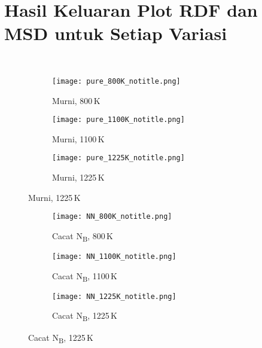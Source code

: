 \section{Hasil Keluaran Plot RDF dan MSD untuk Setiap Variasi}\
\begin{figure}[H]
  \centering
  \begin{subfigure}{0.9\textwidth}
    \centering
    \texttt{[image: pure\_800K\_notitle.png]}
    \caption{Murni, 800 K}
    \label{subfig:rdf_msd_pure_800k}
  \end{subfigure}
  \vspace{1em}
  \begin{subfigure}{0.9\textwidth}
    \centering
    \texttt{[image: pure\_1100K\_notitle.png]}
    \caption{Murni, 1100 K}
    \label{subfig:rdf_msd_pure_1100k}
  \end{subfigure}
  \vspace{1em}
  \begin{subfigure}{0.9\textwidth}
    \centering
    \texttt{[image: pure\_1225K\_notitle.png]}
    \caption{Murni, 1225 K}
    \label{subfig:rdf_msd_pure_1225k}
  \end{subfigure}
  \label{fig:rdf_msd_grid}
\end{figure}

\begin{figure}[H]\ContinuedFloat
  \centering
  \begin{subfigure}{0.9\textwidth}
    \centering
    \texttt{[image: NN\_800K\_notitle.png]}
    \caption{Cacat N\textsubscript{B}, 800 K}
    \label{subfig:rdf_msd_nn_800k}
  \end{subfigure}
  \vspace{1em}
  \begin{subfigure}{0.9\textwidth}
    \centering
    \texttt{[image: NN\_1100K\_notitle.png]}
    \caption{Cacat N\textsubscript{B}, 1100 K}
    \label{subfig:rdf_msd_nn_1100k}
  \end{subfigure}
  \vspace{1em}
  \begin{subfigure}{0.9\textwidth}
    \centering
    \texttt{[image: NN\_1225K\_notitle.png]}
    \caption{Cacat N\textsubscript{B}, 1225 K}
    \label{subfig:rdf_msd_nn_1225k}
  \end{subfigure}
\end{figure}

